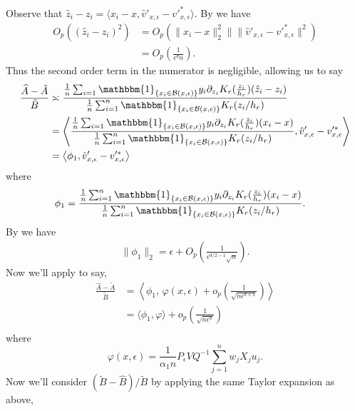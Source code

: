 \documentclass[11pt]{article}
\begin{document}
Observe that $\hat{z}_i - z_i = \langle x_i - x, \hat{v}'_{x, \epsilon} - v'^*_{x, \epsilon}\rangle$. By  we have
\begin{align*}
    O_p((\hat{z}_i - z_i)^2) &= O_p(\|x_i-x\|_2^2\|\|\hat{v}'_{x, \epsilon} - v'^*_{x, \epsilon}\|^2) \\
    &= O_p\left(\frac{1}{\epsilon^{d}n}\right).
\end{align*}
Thus the second order term in the numerator is negligible, allowing us to say
\begin{align}
    \frac{\widehat{A} - \tilde{A}}{\tilde{B}} &\asymp \frac{\frac{1}{n}\sum_{i = 1}\mathbbm{1}_{\{x_i \in \mathcal{B}(x, \epsilon)\}}y_i\partial_{z_i}K_r(\frac{z_i}{h_r})(\hat{z}_i - z_i)}{\frac{1}{n}\sum_{i = 1}^n\mathbbm{1}_{\{x_i \in \mathcal{B}(x, \epsilon)\}}K_r(z_i/h_r)} \\
    &= \left\langle\frac{\frac{1}{n}\sum_{i = 1}\mathbbm{1}_{\{x_i \in \mathcal{B}(x, \epsilon)\}}y_i\partial_{z_i}K_r(\frac{z_i}{h_r})(x_i - x)}{\frac{1}{n}\sum_{i = 1}^n\mathbbm{1}_{\{x_i \in \mathcal{B}(x, \epsilon)\}}K_r(z_i/h_r)}, \hat{v}'_{x, \epsilon} -v'^*_{x, \epsilon}\right\rangle \\
    &= \left\langle\phi_{1}, \hat{v}'_{x, \epsilon} -v'^*_{x, \epsilon}\right\rangle
\end{align}
where
\begin{align}
\phi_{1} &= \frac{\frac{1}{n}\sum_{i = 1}^n\mathbbm{1}_{\{x_i \in \mathcal{B}(x, \epsilon)\}}y_i\partial_{z_i}K_r(\frac{z_i}{h_r})(x_i - x)}{\frac{1}{n}\sum_{i = 1}^n\mathbbm{1}_{\{x_i \in \mathcal{B}(x, \epsilon)\}}K_r(z_i/h_r)}.
\end{align}
By  we have
\begin{align}
    \|\phi_1\|_2 = \epsilon + O_p\left(\frac{1}{\epsilon^{d/2-1}\sqrt{n}}\right).
\end{align}
Now we'll apply  to say,
\begin{align}
    \frac{\widehat{A} - \tilde{A}}{\tilde{B}} &= \left\langle\phi_{1}, \,\varphi(x, \epsilon)  + o_p\left(\frac{1}{\sqrt{n\epsilon^{d+2}}}\right)\right\rangle \\
    &= \langle\phi_{1}, \varphi\rangle + o_p\left(\frac{1}{\sqrt{n\epsilon^{d}}}\right) \\
\end{align}
where 
\[\varphi(x, \epsilon) = \frac{1}{\alpha_1n}P_{\epsilon}VQ^{-1}\sum_{j = 1}^nw_jX_ju_j.\]
Now we'll consider $(\tilde{B} - \widehat{B})/\tilde{B}$ by applying the same Taylor expansion as above,
\end{document}

